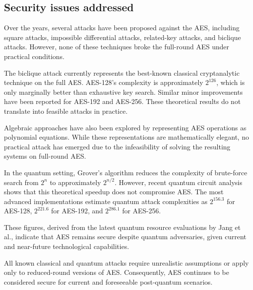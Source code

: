 \subsection{Security issues addressed} 
\label{sec:security_issues}

Over the years, several attacks have been proposed against the AES, 
including square attacks, impossible differential attacks, related-key attacks, and biclique attacks. 
However, none of these techniques broke the full-round AES under practical conditions.

The biclique attack currently represents the best-known classical cryptanalytic technique on the full AES. 
AES-128's complexity is approximately $2^{126}$, which is only marginally better than exhaustive key search. 
Similar minor improvements have been reported for AES-192 and AES-256. 
These theoretical results do not translate into feasible attacks in practice.

Algebraic approaches have also been explored by representing AES operations as polynomial equations. 
While these representations are mathematically elegant, 
no practical attack has emerged due to the infeasibility of solving the resulting systems on full-round AES.

In the quantum setting, Grover's algorithm reduces the complexity of brute-force search from $2^n$ to approximately $2^{n/2}$. 
However, recent quantum circuit analysis shows that this theoretical speedup does not compromise AES. 
The most advanced implementations estimate quantum attack complexities as $2^{156.3}$ for AES-128, $2^{221.6}$ for AES-192, 
and $2^{286.1}$ for AES-256. 

These figures, derived from the latest quantum resource evaluations by Jang et al.\cite{Jang2025}, 
indicate that AES remains secure despite quantum adversaries, 
given current and near-future technological capabilities.

All known classical and quantum attacks require unrealistic assumptions or apply only to reduced-round versions of AES. 
Consequently, AES continues to be considered secure for current and foreseeable post-quantum scenarios.